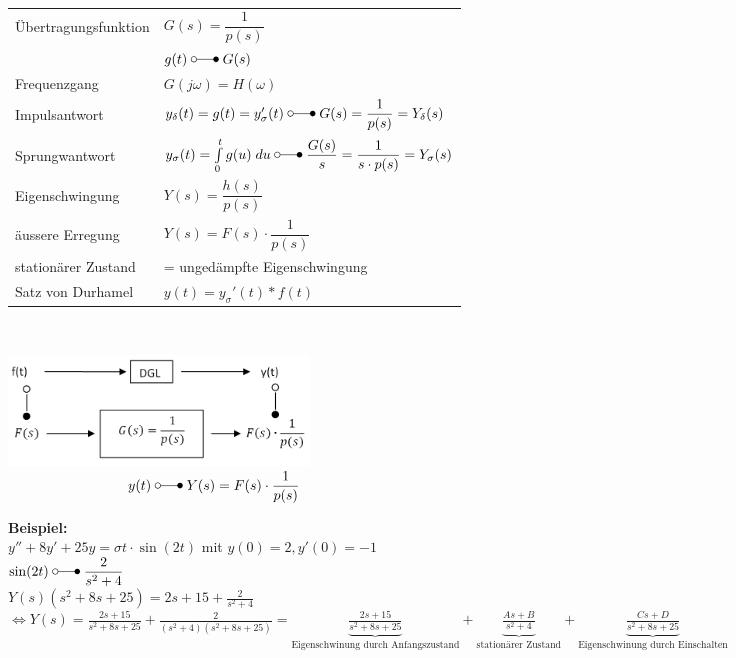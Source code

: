 			\begin{minipage}{12cm}

				\renewcommand{\arraystretch}{2}
					\begin{tabular}{| l | l |}
						\hline
							Übertragungsfunktion & $G(s) = \dfrac{1}{p(s)}$\\
							& $g(t) \; \laplace \; G(s)$ \\
						\hline
							Frequenzgang & $G(j\omega) = H(\omega)$ \\
						\hline
							Impulsantwort & $y_{\delta}(t) = g(t) = y_{\sigma}'(t) \; \laplace \; G(s) = \dfrac{1}{p(s)}=Y_{\delta}(s)$\\
						\hline
							Sprungwantwort & $y_{\sigma}(t)=\int\limits_0^t g(u) \; du \; \laplace \; \dfrac{G(s)}{s} = \dfrac{1}{s \cdot p(s)} = Y_{\sigma}(s)$\\
						\hline
							Eigenschwingung & $Y(s) = \dfrac{h(s)}{p(s)}$ \\
						\hline
							äussere Erregung & $ Y(s) = F(s) \cdot \dfrac{1}{p(s)}$ \\
						\hline
							stationärer Zustand & = ungedämpfte Eigenschwingung\\
						\hline
						\hline
							Satz von Durhamel & $y(t) = y_{\sigma}'(t) * f(t)$\\
						\hline
					\end{tabular}
				\renewcommand{\arraystretch}{\arraystretchOriginal}\\
			
			\end{minipage}
			\begin{minipage}{8cm}
				\includegraphics[width=8cm]{./bilder/diffgleichungen2.png} \\[10mm]

				$ \hspace{3cm} y(t) \; \laplace \; Y(s) = F(s) \cdot \dfrac{1}{p(s)}$	
			\end{minipage}
		
		\newpage
			

		
		
		\begin{minipage}[l]{16cm}
				\textbf{Beispiel:} \\
				$y'' + 8y' + 25y = \sigma{t} \cdot \sin(2t)$ mit $y(0) = 2, y'(0) = -1$\\
				
				$\sin(2t) \; \laplace \; \dfrac{2}{s^2+4}$ \\ $Y(s)(s^2+8s+25) = 2s+15+\frac{2}{s^2+4}$
				$\Leftrightarrow Y(s) = \frac{2s+15}{s^2+8s+25}+\frac{2}{(s^2+4)(s^2+8s+25)}=
				\underbrace{\frac{2s+15}{s^2+8s+25}}_\text{Eigenschwinung durch Anfangszustand} +
				\underbrace{\frac{As + B}{s^2+4}}_\text{stationärer Zustand} +
				\underbrace{\frac{Cs + D}{s^2+8s+25}}_\text{Eigenschwinung durch Einschalten}$
		\end{minipage}
